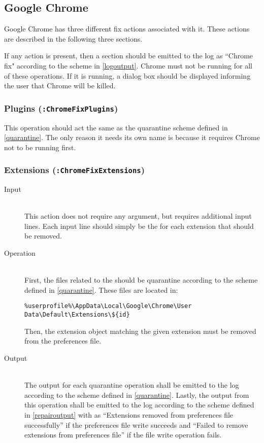 \subsection{Google Chrome}
Google Chrome has three different fix actions associated with it.  These
actions are described in the following three sections.

If any action is present, then a section should be emitted to the log as
``Chrome fix" according to the scheme in \ref{logoutput}.  Chrome must not
be running for all of these operations.  If it is running, a dialog box should
be displayed informing the user that Chrome will be killed. 

\subsubsection{Plugins (\texttt{:ChromeFixPlugins})}
This operation should act the same as the quarantine scheme
defined in \ref{quarantine}. The only reason it needs its own name is because it
requires Chrome not to be running first.

\subsubsection{Extensions (\texttt{:ChromeFixExtensions})}
\begin{description}
\item[Input] \hfill \\
This action does not require any argument, but requires additional input lines. 
Each input line should simply be the  for each extension that should be
removed.  
\item[Operation] \hfill \\
First, the files related to the  should be quarantine according to the
scheme defined in \ref{quarantine}.  These files are located in:
\vspace{-\baselineskip}
\begin{verbatim}
%userprofile%\AppData\Local\Google\Chrome\User Data\Default\Extensions\${id}
\end{verbatim}
Then, the extension object matching the given extension  must be removed
from the preferences file.
\item[Output] \hfill \\
The output for each quarantine operation shall be emitted to the log according
to the scheme defined in \ref{quarantine}.  Lastly, the output from this
operation shall be emitted to the log according to the scheme defined in
\ref{repairoutput} with  as ``Extensions removed from preferences
file successfully'' if the preferences file write succeeds and ``Failed to
remove extensions from preferences file'' if the file write operation fails.
\end{description} 

